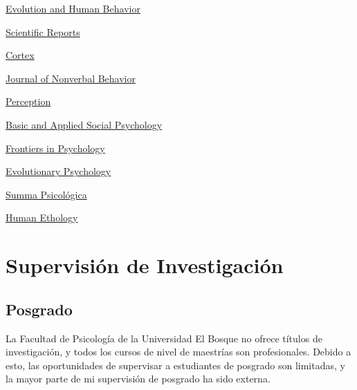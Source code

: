 \documentclass[11pt,a4paper,]{awesome-cv}
\begin{document}
\begin{cventries}
{\begin{cvitems}
\item \href{https://www.sciencedirect.com/journal/evolution-and-human-behavior}{Evolution and Human Behavior}
\item \href{https://www.nature.com/srep/}{Scientific Reports}
\item \href{https://www.sciencedirect.com/journal/cortex}{Cortex}
\item \href{https://www.springer.com/journal/10919/}{Journal of Nonverbal Behavior}
\item \href{https://journals.sagepub.com/home/pec}{Perception}
\item \href{https://www.tandfonline.com/journals/hbas20}{Basic and Applied Social Psychology}
\item \href{https://www.frontiersin.org/journals/psychology}{Frontiers in Psychology}
\item \href{https://journals.sagepub.com/home/evp}{Evolutionary Psychology}
\item \href{http://sumapsicologica.konradlorenz.edu.co/}{Summa Psicológica}
\item \href{https://ishe.org/human-ethology/}{Human Ethology}
\end{cvitems}}
\end{cventries}

\section{Supervisión de
Investigación}\label{supervisiuxf3n-de-investigaciuxf3n}

\subsection{\texorpdfstring{\textbf{Posgrado}}{}}\label{section-3}

La Facultad de Psicología de la Universidad El Bosque no ofrece títulos
de investigación, y todos los cursos de nivel de maestrías son
profesionales. Debido a esto, las oportunidades de supervisar a
estudiantes de posgrado son limitadas, y la mayor parte de mi
supervisión de posgrado ha sido externa.
\end{document}
